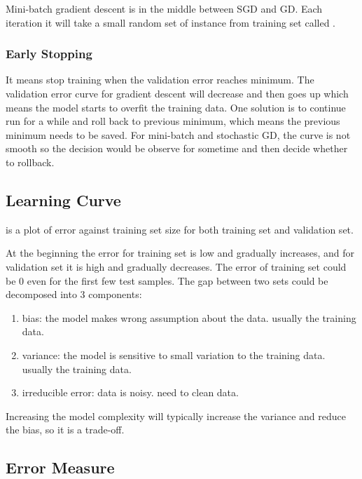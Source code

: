 Mini-batch gradient descent is in the middle between SGD and GD. Each iteration it will take a small random set of instance from training set called .


\subsubsection{Early Stopping}

It means stop training when the validation error reaches minimum. The validation error curve for gradient descent will decrease and then goes up which means the model starts to overfit the training data. One solution is to continue run for a while and roll back to previous minimum, which means the previous minimum needs to be saved. For mini-batch and stochastic GD, the curve is not smooth so the decision would be observe for sometime and then decide whether to rollback.




\subsection{Learning Curve}

 is a plot of error against training set size for both training set and validation set. 

At the beginning the error for training set is low and gradually increases, and for validation set it is high and gradually decreases. The error of training set could be $0$ even for the first few test samples. The gap between two sets could be decomposed into 3 components:
\begin{enumerate}
	\item bias: the model makes wrong assumption about the data. usually  the training data.
	\item variance: the model is sensitive to small variation to the training data. usually  the training data.
	\item irreducible error: data is noisy. need to clean data.
\end{enumerate}

Increasing the model complexity will typically increase the variance and reduce the bias, so it is a trade-off.






\subsection{Error Measure}

